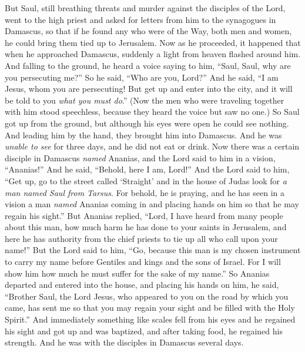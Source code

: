 \begin{biblechapter} %
 But Saul, still breathing threats and murder against the disciples of the Lord, went to the high priest
\verse and asked for letters from him to the synagogues in Damascus, so that if he found any who were of the Way, both men and women, he could bring them tied up to Jerusalem.
\verse Now as he proceeded, it happened that when he approached Damascus, suddenly a light from heaven flashed around him.
\verse And falling to the ground, he heard a voice saying to him, “Saul, Saul, why are you persecuting me?”
\verse So he said, “Who are you, Lord?” And he said, “I am Jesus, whom you are persecuting!
\verse But get up and enter into the city, and it will be told to you \textit{what you must do}.”
\verse (Now the men who were traveling together with him stood speechless, because they heard the voice but saw no one.)
\verse So Saul got up from the ground, but although his eyes were open he could see nothing. And leading him by the hand, they brought him into Damascus.
\verse And he was \textit{unable to see} for three days, and he did not eat or drink.
 Now there was a certain disciple in Damascus \textit{named} Ananias, and the Lord said to him in a vision, “Ananias!” And he said, “Behold, here I am, Lord!”
\verse And the Lord said to him, “Get up, go to the street called ‘Straight’ and in the house of Judas look for \textit{a man named Saul from Tarsus}. For behold, he is praying,
\verse and he has seen in a vision a man \textit{named} Ananias coming in and placing hands on him so that he may regain his sight.”
\verse But Ananias replied, “Lord, I have heard from many people about this man, how much harm he has done to your saints in Jerusalem,
\verse and here he has authority from the chief priests to tie up all who call upon your name!”
\verse But the Lord said to him, “Go, because this man is my chosen instrument to carry my name before Gentiles and kings and the sons of Israel.
\verse For I will show him how much he must suffer for the sake of my name.”
\verse So Ananias departed and entered into the house, and placing his hands on him, he said, “Brother Saul, the Lord Jesus, who appeared to you on the road by which you came, has sent me so that you may regain your sight and be filled with the Holy Spirit.”
\verse And immediately something like scales fell from his eyes and he regained his sight and got up and was baptized,
\verse and after taking food, he regained his strength. And he was with the disciples in Damascus several days.

\end{biblechapter}
